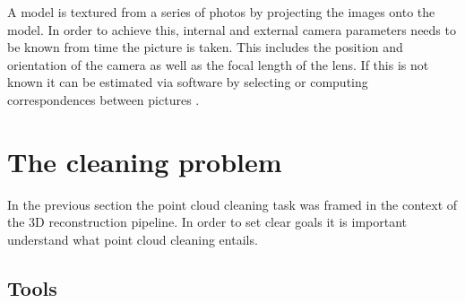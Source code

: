 A model is textured from a series of photos by projecting the images onto the model. In order to achieve this, internal and external camera parameters needs to be known from time the picture is taken. This includes the position and orientation of the camera as well as the focal length of the lens. If this is not known it can be estimated via software by selecting or computing correspondences between pictures \cite{Ruther2011}.



\section{The cleaning problem}

In the previous section the point cloud cleaning task was framed in the context of the 3D reconstruction pipeline. In order to set clear goals it is important understand what point cloud cleaning entails.




\subsection{Tools}


